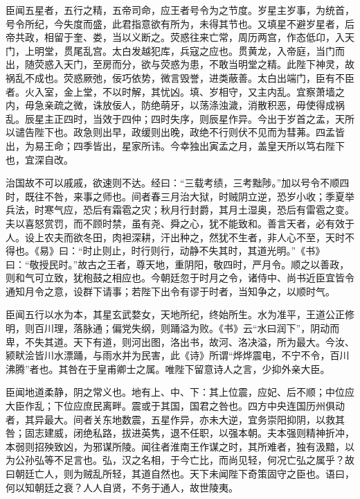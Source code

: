 \documentclass[12pt,UTF8]{ctexbook}
\begin{document}
臣闻五星者，五行之精，五帝司命，应王者号令为之节度。岁星主岁事，为统首，号令所纪，今失度而盛，此君指意欲有所为，未得其节也。又填星不避岁星者，后帝共政，相留于奎、娄，当以义断之。荧惑往来亡常，周历两宫，作态低卬，入天门，上明堂，贯尾乱宫。太白发越犯库，兵寇之应也。贯黄龙，入帝庭，当门而出，随荧惑入天门，至房而分，欲与荧惑为患，不敢当明堂之精。此陛下神灵，故祸乱不成也。荧惑厥弛，佞巧依势，微言毁誉，进类蔽善。太白出端门，臣有不臣者。火入室，金上堂，不以时解，其忧凶。填、岁相守，又主内乱。宜察萧墙之内，毋急亲疏之微，诛放佞人，防绝萌牙，以荡涤浊濊，消散积恶，毋使得成祸乱。辰星主正四时，当效于四仲；四时失序，则辰星作异。今出于岁首之孟，天所以谴告陛下也。政急则出早，政缓则出晚，政绝不行则伏不见而为彗茀。四孟皆出，为易王命；四季皆出，星家所讳。今幸独出寅孟之月，盖皇天所以笃右陛下也，宜深自改。



治国故不可以戚戚，欲速则不达。经曰：“三载考绩，三考黜陟。”加以号令不顺四时，既往不咎，来事之师也。间者春三月治大狱，时贼阴立逆，恐岁小收；季夏举兵法，时寒气应，恐后有霜雹之灾；秋月行封爵，其月土湿奥，恐后有雷雹之变。夫以喜怒赏罚，而不顾时禁，虽有尧、舜之心，犹不能致和。善言天者，必有效于人。设上农夫而欲冬田，肉袒深耕，汗出种之，然犹不生者，非人心不至，天时不得也。《易》曰：“时止则止，时行则行，动静不失其时，其道光明。”《书》曰：“敬授民时。”故古之王者，尊天地，重阴阳，敬四时，严月令。顺之以善政，则和气可立致，犹枹鼓之相应也。今朝廷忽于时月之令，诸侍中、尚书近臣宜皆令通知月令之意，设群下请事；若陛下出令有谬于时者，当知争之，以顺时气。



臣闻五行以水为本，其星玄武婺女，天地所纪，终始所生。水为准平，王道公正修明，则百川理，落脉通；偏党失纲，则踊溢为败。《书》云“水曰润下”，阴动而卑，不失其道。天下有道，则河出图，洛出书，故河、洛决溢，所为最大。今汝、颍畎浍皆川水漂踊，与雨水并为民害，此《诗》所谓“烨烨震电，不宁不令，百川沸腾”者也。其咎在于皇甫卿士之属。唯陛下留意诗人之言，少抑外亲大臣。



臣闻地道柔静，阴之常义也。地有上、中、下：其上位震，应妃、后不顺；中位应大臣作乱；下位应庶民离畔。震或于其国，国君之咎也。四方中央连国历州俱动者，其异最大。间者关东地数震，五星作异，亦未大逆，宜务崇阳抑阴，以救其咎；固志建威，闭绝私路，拔进英隽，退不任职，以强本朝。夫本强则精神折冲，本弱则招殃致凶，为邪谋所陵。闻往者淮南王作谋之时，其所难者，独有汲黯，以为公孙弘等不足言也。弘，汉之名相，于今亡比，而尚见轻，何况亡弘之属乎？故曰朝廷亡人，则为贼乱所轻，其道自然也。天下未闻陛下奇策固守之臣也。语曰，何以知朝廷之衰？人人自贤，不务于通人，故世陵夷。
\end{document}
